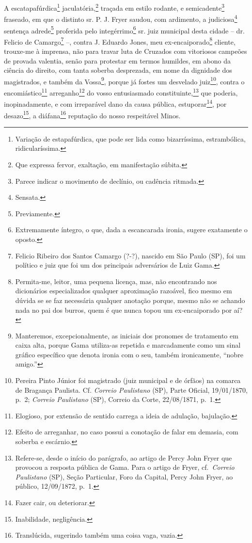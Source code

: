 A escatapafúrdica\footnote{ Variação de estapafúrdica, que pode ser
  lida como bizarríssima, estrambólica, ridicularíssima.}
jaculatória,\footnote{ Que expressa fervor, exaltação, em manifestação
  súbita.} traçada em estilo rodante, e semicadente\footnote{ Parece
  indicar o movimento de declínio, ou cadência ritmada.} fraseado, em
que o distinto sr. P. J. Fryer saudou, com ardimento, a
judiciosa\footnote{ Sensata.} sentença adrede\footnote{ Previamente.}
proferida pelo integérrimo\footnote{ Extremamente íntegro, o que, dada
  a escancarada ironia, sugere exatamente o oposto.} sr. juiz municipal
desta cidade -- dr. Felicio de Camargo\footnote{ Felicio Ribeiro dos
  Santos Camargo (?-?), nascido em São Paulo (SP), foi um político e
  juiz que foi um dos principais adversários de Luiz Gama.} --, contra
J. Eduardo Jones, meu ex-encaiporado\footnote{ Permita-me, leitor, uma
  pequena licença, mas, não encontrando nos dicionários especializados
  qualquer aproximação razoável, fico mesmo em dúvida se se faz
  necessária qualquer anotação porque, mesmo não se achando nada no pai
  dos burros, quem é que nunca topou um ex-encaiporado por aí?} cliente,
trouxe-me à imprensa, não para travar luta de Cruzados com vitoriosos
campeões de provada valentia, senão para protestar em termos humildes,
em abono da ciência do direito, com tanta soberba desprezada, em nome da
dignidade dos magistrados, e também da Vossa\footnote{ Manteremos,
  excepcionalmente, as iniciais dos pronomes de tratamento em caixa
  alta, porque Gama utiliza-as repetida e marcadamente como um sinal
  gráfico específico que denota ironia com o seu, também ironicamente,
  ``nobre amigo.''}, porque já fostes um desvelado juiz\footnote{ Pereira
  Pinto Júnior foi magistrado (juiz municipal e de órfãos) na comarca de
  Bragança Paulista. Cf. \emph{Correio Paulistano} (SP), Parte Oficial,
  19/01/1870, p.~2; \emph{Correio Paulistano} (SP), Correio da Corte,
  22/08/1871, p.~1.}, contra o encomiástico\footnote{ Elogioso, por
  extensão de sentido carrega a ideia de adulação, bajulação.}
arreganho\footnote{ Efeito de arreganhar, no caso possui a conotação de
  falar em demasia, com soberba e escárnio.} do vosso entusiasmado
constituinte,\footnote{ Refere-se, desde o início do parágrafo, ao
  artigo de Percy John Fryer que provocou a resposta pública de Gama.
  Para o artigo de Fryer, cf.~\emph{Correio Paulistano} (SP), Seção
  Particular, Foro da Capital, Percy John Fryer, ao público, 12/09/1872,
  p.~1.} que poderia, inopinadamente, e com irreparável dano da causa
pública, estuporar\footnote{ Fazer cair, ou deteriorar.}, por
desazo\footnote{ Inabilidade, negligência.}, a diáfana\footnote{
  Translúcida, sugerindo também uma coisa vaga, vazia.} reputação do
nosso respeitável Minos.

